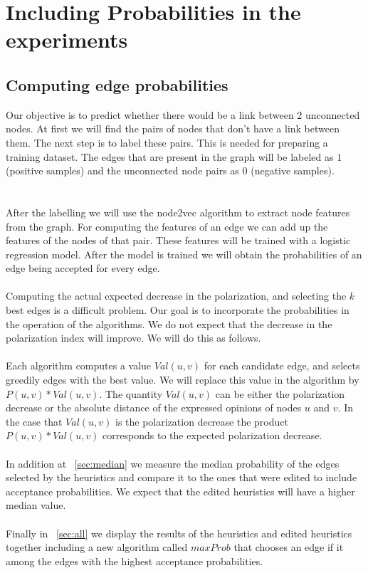 \chapter{Including Probabilities in the experiments}		
 \label{sec:prob}		

\section{Computing edge probabilities }		
\label{sec:computingEdge}		
\vspace{20pt}
Our objective is to predict whether there would be a link between 2 unconnected nodes. At first we will find the pairs of nodes that don't have a link between them.	
The next step is to label these pairs. This is needed for preparing a training dataset. 
The edges that are present in the graph will be labeled as $1$ (positive samples) and the unconnected node pairs as $0$ (negative samples).		
\\
\\
\\
\noindent After the labelling we will use the node2vec algorithm to extract node features from the graph. For computing the features of an edge we can add up the features of the nodes of that pair. These features will be trained with a logistic regression model. After the model is trained we will obtain the probabilities of an edge being accepted for every edge.
\\
\\
\noindent Computing the actual expected decrease in the polarization, and selecting the $k$ best edges is a difficult problem. Our goal is to incorporate the probabilities in the operation of the algorithms. We do not expect that the decrease in the polarization index will improve. We will do this as follows. 
\\
\\
Each algorithm computes a value $Val(u,v)$ for each candidate edge, and selects greedily edges with the best value. We will replace this value in the algorithm by $P(u,v)*Val(u,v)$. The quantity $Val(u,v)$ can be either the polarization decrease or the absolute distance of the expressed opinions of nodes $u$ and $v$. In the case that $Val(u,v)$ is the polarization decrease the product $P(u,v)*Val(u,v)$ corresponds to the expected polarization decrease.
\\
\\
In addition at ~\ref{sec:median} we measure the median probability of the edges selected by the heuristics and compare it to the ones that were edited to include acceptance probabilities. We expect that the edited heuristics will have a higher median value.
\\
\\
Finally in ~\ref{sec:all} we display the results of the heuristics and edited heuristics together including a new algorithm called $maxProb$ that chooses an edge if it among the edges with the highest acceptance probabilities.

